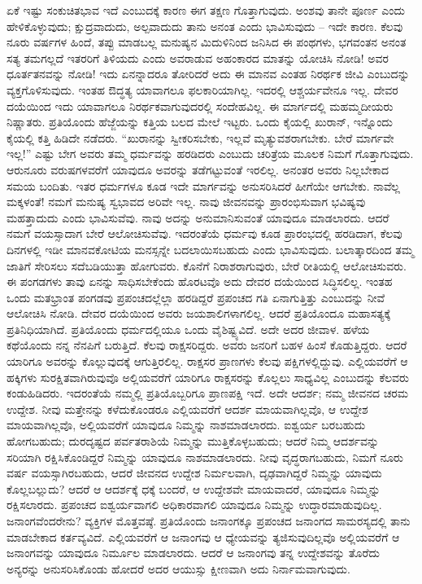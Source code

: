 \vskip 5pt

ಏಕೆ ಇಷ್ಟು ಸಂಕುಚಿತಭಾವ ಇದೆ ಎಂಬುದಕ್ಕೆ ಕಾರಣ ಈಗ ತಕ್ಷಣ ಗೊತ್ತಾಗುವುದು. ಅಂಶವು ತಾನೇ ಪೂರ್ಣ ಎಂದು ಹೇಳಿಕೊಳ್ಳುವುದು; ಕ್ಷುದ್ರವಾದುದು, ಅಲ್ಪವಾದುದು ತಾನು ಅನಂತ ಎಂದು ಭಾವಿಸುವುದು – ಇದೇ ಕಾರಣ. ಕೆಲವು ನೂರು ವರ್ಷಗಳ ಹಿಂದೆ, ತಪ್ಪು ಮಾಡಬಲ್ಲ ಮನುಷ್ಯನ ಮಿದುಳಿನಿಂದ ಜನಿಸಿದ ಈ ಪಂಥಗಳು, ಭಗವಂತನ ಅನಂತ ಸತ್ಯ ತಮಗಲ್ಲದೆ ಇತರರಿಗೆ ತಿಳಿಯದು ಎಂದು ಅವರಾಡುವ ಅಹಂಕಾರದ ಮಾತನ್ನು ಯೋಚಿಸಿ ನೋಡಿ! ಅವರ ಧೂರ್ತತನವನ್ನು ನೋಡಿ! ಇದು ಏನನ್ನಾದರೂ ತೋರಿದರೆ ಅದು ಈ ಮಾನವ ಎಂತಹ ನಿರರ್ಥಕ ಜೀವಿ ಎಂಬುದನ್ನು ವ್ಯಕ್ತಗೊಳಿಸುವುದು. ಇಂತಹ ಔದ್ಧತ್ಯ ಯಾವಾಗಲೂ ಫಲಕಾರಿಯಾಗಿಲ್ಲ. ಇದರಲ್ಲಿ ಆಶ್ಚರ್ಯವೇನೂ ಇಲ್ಲ. ದೇವರ ದಯೆಯಿಂದ ಇದು ಯಾವಾಗಲೂ ನಿರರ್ಥಕವಾಗುವುದರಲ್ಲಿ ಸಂದೇಹವಿಲ್ಲ. ಈ ಮಾರ್ಗದಲ್ಲಿ ಮಹಮ್ಮದೀಯರು ನಿಷ್ಣಾತರು. ಪ್ರತಿಯೊಂದು ಹೆಜ್ಜೆಯನ್ನು ಕತ್ತಿಯ ಬಲದ ಮೇಲೆ ಇಟ್ಟರು. ಒಂದು ಕೈಯಲ್ಲಿ ಖುರಾನ್​, ಇನ್ನೊಂದು ಕೈಯಲ್ಲಿ ಕತ್ತಿ ಹಿಡಿದೇ ನಡೆದರು. “ಖುರಾನನ್ನು ಸ್ವೀಕರಿಸಬೇಕು, ಇಲ್ಲವೆ ಮೃತ್ಯುವಶರಾಗಬೇಕು. ಬೇರೆ ಮಾರ್ಗವೇ ಇಲ್ಲ!” ಎಷ್ಟು ಬೇಗ ಅವರು ತಮ್ಮ ಧರ್ಮವನ್ನು ಹರಡಿದರು ಎಂಬುದು ಚರಿತ್ರೆಯ ಮೂಲಕ ನಿಮಗೆ ಗೊತ್ತಾಗುವುದು. ಆರುನೂರು ವರುಷಗಳವರೆಗೆ ಯಾವುದೂ ಅವರನ್ನು ತಡೆಗಟ್ಟುವಂತೆ ಇರಲಿಲ್ಲ. ಅನಂತರ ಅವರು ನಿಲ್ಲಬೇಕಾದ ಸಮಯ ಬಂದಿತು. ಇತರ ಧರ್ಮಗಳೂ ಕೂಡ ಇದೇ ಮಾರ್ಗವನ್ನು ಅನುಸರಿಸಿದರೆ ಹೀಗೆಯೇ ಆಗಬೇಕು. ನಾವೆಲ್ಲ ಮಕ್ಕಳಂತೆ! ನಮಗೆ ಮನುಷ್ಯ ಸ್ವಭಾವದ ಅರಿವೇ ಇಲ್ಲ. ನಾವು ಜೀವನವನ್ನು ಪ್ರಾರಂಭಿಸುವಾಗ ಭವಿಷ್ಯವು ಮಹತ್ತಾದುದು ಎಂದು ಭಾವಿಸುವೆವು. ನಾವು ಅದನ್ನು ಅನುಮಾನಿಸುವಂತೆ ಯಾವುದೂ ಮಾಡಲಾರದು. ಆದರೆ ನಮಗೆ ವಯಸ್ಸಾದಾಗ ಬೇರೆ ಆಲೋಚಿಸುವೆವು. ಇದರಂತೆಯೆ ಧರ್ಮವು ಕೂಡ ಪ್ರಾರಂಭದಲ್ಲಿ ಹರಡಿದಾಗ, ಕೆಲವು ದಿನಗಳಲ್ಲಿ ಇಡೀ ಮಾನವಕೋಟಿಯ ಮನಸ್ಸನ್ನೇ ಬದಲಾಯಿಸಬಹುದು ಎಂದು ಭಾವಿಸುವುದು. ಬಲಾತ್ಕಾರದಿಂದ ತಮ್ಮ ಜಾತಿಗೆ ಸೇರಿಸಲು ಸದೆಬಡಿಯುತ್ತಾ ಹೋಗುವರು. ಕೊನೆಗೆ ನಿರಾಶರಾಗುವುರು, ಬೇರೆ ರೀತಿಯಲ್ಲಿ ಆಲೋಚಿಸುವರು. ಈ ಪಂಗಡಗಳು ತಾವು ಏನನ್ನು ಸಾಧಿಸಬೇಕೆಂದು ಹೊರಟವೊ ಅದು ದೇವರ ದಯೆಯಿಂದ ಸಿದ್ಧಿಸಲಿಲ್ಲ. ಇಂತಹ ಒಂದು ಮತಭ್ರಾಂತ ಪಂಗಡವು ಪ್ರಪಂಚದಲ್ಲೆಲ್ಲಾ ಹರಡಿದ್ದರೆ ಪ್ರಪಂಚದ ಗತಿ ಏನಾಗುತ್ತಿತ್ತು ಎಂಬುದನ್ನು ನೀವೆ ಆಲೋಚಿಸಿ ನೋಡಿ. ದೇವರ ದಯೆಯಿಂದ ಅವರು ಜಯಶಾಲಿಗಳಾಗಲಿಲ್ಲ. ಆದರೆ ಪ್ರತಿಯೊಂದೂ ಮಹಾಸತ್ಯಕ್ಕೆ ಪ್ರತಿನಿಧಿಯಾಗಿದೆ. ಪ್ರತಿಯೊಂದು ಧರ್ಮದಲ್ಲಿಯೂ ಒಂದು ವೈಶಿಷ್ಟ್ಯವಿದೆ. ಅದೇ ಅದರ ಜೀವಾಳ. ಹಳೆಯ ಕಥೆಯೊಂದು ನನ್ನ ನೆನಪಿಗೆ ಬರುತ್ತಿದೆ. ಕೆಲವು ರಾಕ್ಷಸರಿದ್ದರು. ಅವರು ಜನರಿಗೆ ಬಹಳ ಹಿಂಸೆ ಕೊಡುತ್ತಿದ್ದರು. ಆದರೆ ಯಾರಿಗೂ ಅವರನ್ನು ಕೊಲ್ಲುವುದಕ್ಕೆ ಆಗುತ್ತಿರಲಿಲ್ಲ. ರಾಕ್ಷಸರ ಪ್ರಾಣಗಳು ಕೆಲವು ಪಕ್ಷಿಗಳಲ್ಲಿದ್ದುವು. ಎಲ್ಲಿಯವರೆಗೆ ಆ ಹಕ್ಕಿಗಳು ಸುರಕ್ಷಿತವಾಗಿರುವುವೊ ಅಲ್ಲಿಯವರೆಗೆ ಯಾರಿಗೂ ರಾಕ್ಷಸರನ್ನು ಕೊಲ್ಲಲು ಸಾಧ್ಯವಿಲ್ಲ ಎಂಬುದನ್ನು ಕೆಲವರು ಕಂಡುಹಿಡಿದರು. ಇದರಂತೆಯೆ ನಮ್ಮಲ್ಲಿ ಪ್ರತಿಯೊಬ್ಬರಿಗೂ ಪ್ರಾಣಪಕ್ಷಿ ಇದೆ. ಅದೇ ಆದರ್ಶ; ನಮ್ಮ ಜೀವನದ ಚರಮ ಉದ್ದೇಶ. ನೀವು ಮತ್ತೇನನ್ನು ಕಳೆದುಕೊಂಡರೂ ಎಲ್ಲಿಯವರೆಗೆ ಆದರ್ಶ ಮಾಯವಾಗಿಲ್ಲವೊ, ಆ ಉದ್ದೇಶ ಮಾಯವಾಗಿಲ್ಲವೊ, ಅಲ್ಲಿಯವರೆಗೆ ಯಾವುದೂ ನಿಮ್ಮನ್ನು ನಾಶಮಾಡಲಾರದು. ಐಶ್ವರ್ಯ ಬರಬಹುದು ಹೋಗಬಹುದು; ದುರದೃಷ್ಟದ ಪರ್ವತರಾಶಿಯೆ ನಿಮ್ಮನ್ನು ಮುತ್ತಿಕೊಳ್ಳಬಹುದು; ಆದರೆ ನಿಮ್ಮ ಆದರ್ಶವನ್ನು ಸರಿಯಾಗಿ ರಕ್ಷಿಸಿಕೊಂಡಿದ್ದರೆ ನಿಮ್ಮನ್ನು ಯಾವುದೂ ನಾಶಮಾಡಲಾರದು. ನೀವು ವೃದ್ಧರಾಗಬಹುದು, ನಿಮಗೆ ನೂರು ವರ್ಷ ವಯಸ್ಸಾಗಿರಬಹುದು, ಆದರೆ ಜೀವನದ ಉದ್ದೇಶ ನಿರ್ಮಲವಾಗಿ, ದೃಢವಾಗಿದ್ದರೆ ನಿಮ್ಮನ್ನು ಯಾವುದು ಕೊಲ್ಲಬಲ್ಲುದು? ಆದರೆ ಆ ಆದರ್ಶಕ್ಕೆ ಧಕ್ಕೆ ಬಂದರೆ, ಆ ಉದ್ದೇಶವೇ ಮಾಯವಾದರೆ, ಯಾವುದೂ ನಿಮ್ಮನ್ನು ರಕ್ಷಿಸಲಾರದು. ಪ್ರಪಂಚದ ಐಶ್ವರ್ಯವಾಗಲಿ ಅಧಿಕಾರವಾಗಲಿ ಯಾವುದೂ ನಿಮ್ಮನ್ನು ಉದ್ಧಾರಮಾಡುವುದಿಲ್ಲ. ಜನಾಂಗವೆಂದರೇನು? ವ್ಯಕ್ತಿಗಳ ಮೊತ್ತವಷ್ಠೆ. ಪ್ರತಿಯೊಂದು ಜನಾಂಗಕ್ಕೂ ಪ್ರಪಂಚದ ಜನಾಂಗದ ಸಾಮರಸ್ಯದಲ್ಲಿ ತಾನು ಮಾಡಬೇಕಾದ ಕರ್ತವ್ಯವಿದೆ. ಎಲ್ಲಿಯವರೆಗೆ ಆ ಜನಾಂಗವು ಆ ಧ್ಯೇಯವನ್ನು ತ್ಯಜಿಸುವುದಿಲ್ಲವೊ ಅಲ್ಲಿಯವರೆಗೆ ಆ ಜನಾಂಗವನ್ನು ಯಾವುದೂ ನಿರ್ಮೂಲ ಮಾಡಲಾರದು. ಆದರೆ ಆ ಜನಾಂಗವು ತನ್ನ ಉದ್ದೇಶವನ್ನು ತೊರೆದು ಅನ್ಯರನ್ನು ಅನುಸರಿಸಿಕೊಂಡು ಹೋದರೆ ಅದರ ಆಯುಸ್ಸು ಕ್ಷೀಣವಾಗಿ ಅದು ನಿರ್ನಾಮವಾಗುವುದು.


